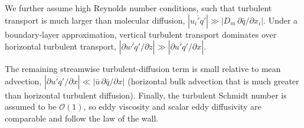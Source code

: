 \documentclass{article}
\begin{document}
    We further assume high Reynolds number conditions, such that turbulent transport is much larger than molecular diffusion,
    $\left| \overline{u_i' q'} \right| \gg \left| D_m\,\partial \bar q/\partial x_i \right|$.
    Under a boundary-layer approximation, vertical turbulent transport dominates over horizontal
    turbulent transport,   $\left| \partial \overline{w' q'} / \partial z \right| \gg \left| \partial \overline{u' q'} / \partial x \right|$.
    
    The remaining streamwise turbulent-diffusion term is small relative to mean advection,
    $\left| \partial \overline{u' q'} / \partial x \right| \ll \left| \bar u\,\partial \bar q/\partial x \right|$ (horizontal bulk advection that is much greater than horizontal turbulent diffusion). 
     Finally, the turbulent Schmidt number is assumed to be ${\mathcal O}(1)$,  so eddy viscosity and scalar eddy diffusivity are comparable and follow the law of the wall.
    
    
    
\end{document}
